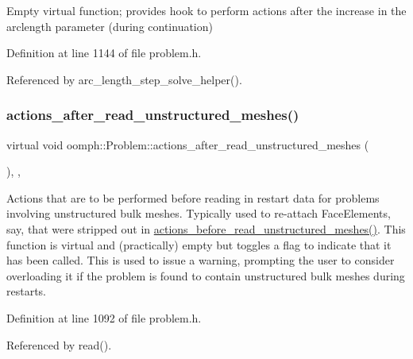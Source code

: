 Empty virtual function; provides hook to perform actions after the increase in the arclength parameter (during continuation) 



Definition at line 1144 of file problem.\+h.



Referenced by arc\+\_\+length\+\_\+step\+\_\+solve\+\_\+helper().

\mbox{\label{classoomph_1_1Problem_a498317b3e390eddf2169ab989ee8d6b4}} 
\subsubsection{\texorpdfstring{actions\+\_\+after\+\_\+read\+\_\+unstructured\+\_\+meshes()}{actions\_after\_read\_unstructured\_meshes()}}
{\footnotesize\ttfamily virtual void oomph\+::\+Problem\+::actions\+\_\+after\+\_\+read\+\_\+unstructured\+\_\+meshes (\begin{DoxyParamCaption}{ }\end{DoxyParamCaption})\hspace{0.3cm}{\ttfamily [inline]}, {\ttfamily [protected]}, {\ttfamily [virtual]}}



Actions that are to be performed before reading in restart data for problems involving unstructured bulk meshes. Typically used to re-\/attach Face\+Elements, say, that were stripped out in \hyperlink{classoomph_1_1Problem_af10662119a7a0c3a47879fa0d0644452}{actions\+\_\+before\+\_\+read\+\_\+unstructured\+\_\+meshes()}. This function is virtual and (practically) empty but toggles a flag to indicate that it has been called. This is used to issue a warning, prompting the user to consider overloading it if the problem is found to contain unstructured bulk meshes during restarts. 



Definition at line 1092 of file problem.\+h.



Referenced by read().

\mbox{\label{classoomph_1_1Problem_a6130d5c9a762cdd1569919a601620796}} 
